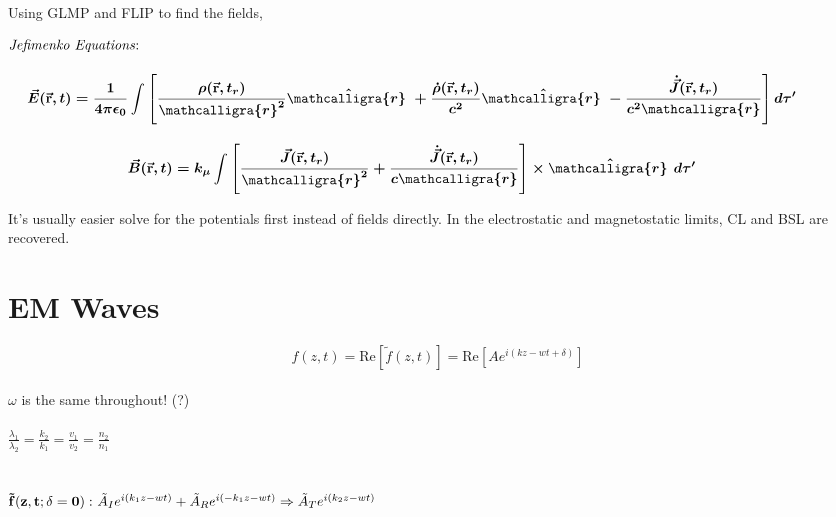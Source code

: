 \documentclass[12pt]{article}
\newcommand{\scripty}[1]{\ensuremath{\mathcalligra{#1}}}
\newcommand*{\cursr}{\scripty{r}}		%
\newcommand*{\cursrr}{\scripty{r}\ }
\newcommand{\hs}{\hspace{1pt}}
\begin{document}
\begin{minipage}[t]{0.49\textwidth}
	Using GLMP and FLIP to find the fields,

	\vspace{15pt}
	\(\boldsymbol{
		\begin{aligned}
			&\text{\emph{Jefimenko Equations}:}\\[10pt]
			&\ \ \ \ \begin{gathered}
				\vec{E}( \vec{ \mathbf{r} }, t) = \frac{1}{4 \pi \epsilon_0} 
					\int \left [ \frac{ \rho ( \vec{ \mathbf{r} }, t_r ) }{\cursr^2} \hat{\cursrr} 
					+ \frac{ \dot{\rho} ( \vec{ \mathbf{r} }, t_r ) }{c^2} \hat{\cursrr} 
					- \frac{ \dot{\vec{J}} ( \vec{ \mathbf{r} }, t_r ) }{c^2 \cursr} \right ] d\tau'
					\\[10pt]
				\vec{B}( \vec{ \mathbf{r} }, t) = k_\mu
					\int \left [ \frac{ \vec{J} ( \vec{ \mathbf{r} }, t_r ) }{\cursr^2} 
					+ \frac{ \dot{ \vec{J} } ( \vec{ \mathbf{r} }, t_r ) }{c \cursr} \right ] \times \hat{\cursrr} \hs d\tau'
			\end{gathered}
		\end{aligned}
	}\)

	\vspace{20pt}
	It's usually easier solve for the potentials first instead of fields directly. In 
	the electrostatic and magnetostatic limits, CL and BSL are recovered.
\end{minipage}


\newpage
\section{EM Waves}

\[ f(z,t) = \text{Re}[ \tilde f(z,t) ] = \text{Re}\left[ Ae^{i(kz-wt+\delta)} \right] \] \\
$\omega$ is the same throughout! (?) \\ \\
$\displaystyle \frac{\lambda_1}{\lambda_2} = \frac{k_2}{k_1} = \frac{v_1}{v_2} = \frac{n_2}{n_1}$ \\ \\ \\
${\bf \tilde f(z,t; \delta = 0): }\ \tilde A_I e^{ i(k_1z-wt) } + \tilde A_R e^{ i(-k_1z-wt) } \Rightarrow \tilde A_T e^{ i(k_2z-wt) }$ \\
\end{document}
